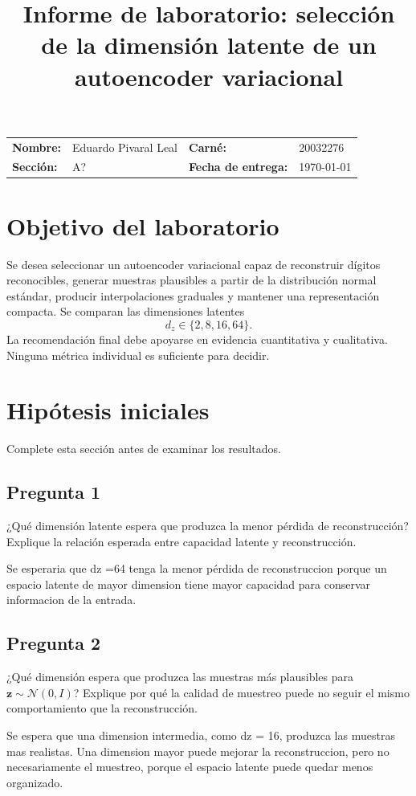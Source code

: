 \documentclass[11pt,letterpaper]{article}
\title{\textbf{Informe de laboratorio: selección de la dimensión latente de un autoencoder variacional}}
\author{}
\date{}
\newcommand{\studentname}{Eduardo Pivaral Leal}
\newcommand{\studentid}{20032276}
\newcommand{\coursesection}{A?}
\newcommand{\submissiondate}{\today}
\begin{document}
\maketitle

\begin{center}
\renewcommand{\arraystretch}{1.35}
\begin{tabularx}{0.92\textwidth}{@{}>{\bfseries}lX>{\bfseries}lX@{}}
Nombre: & \studentname & Carné: & \studentid \\
Sección: & \coursesection & Fecha de entrega: & \submissiondate \\
\end{tabularx}
\end{center}

\section{Objetivo del laboratorio}

Se desea seleccionar un autoencoder variacional capaz de reconstruir dígitos
reconocibles, generar muestras plausibles a partir de la distribución normal
estándar, producir interpolaciones graduales y mantener una representación
compacta. Se comparan las dimensiones latentes
\[
d_z\in\{2,8,16,64\}.
\]
La recomendación final debe apoyarse en evidencia cuantitativa y cualitativa.
Ninguna métrica individual es suficiente para decidir.

\section{Hipótesis iniciales}

Complete esta sección antes de examinar los resultados.

\subsection*{Pregunta 1}
¿Qué dimensión latente espera que produzca la menor pérdida de reconstrucción?
Explique la relación esperada entre capacidad latente y reconstrucción.
\begin{responsebox}
Se esperaria que dz =64 tenga la menor pérdida de reconstruccion porque un espacio latente de mayor dimension tiene mayor capacidad para conservar informacion de la entrada. 
\end{responsebox}


\subsection*{Pregunta 2}
¿Qué dimensión espera que produzca las muestras más plausibles para
$\mathbf z\sim\mathcal N(0,I)$? Explique por qué la calidad de muestreo puede no
seguir el mismo comportamiento que la reconstrucción.
\begin{responsebox}
Se espera que una dimension intermedia, como dz = 16, produzca las muestras mas realistas. Una dimension mayor puede mejorar la reconstruccion, pero no necesariamente el muestreo, porque el espacio latente puede quedar menos organizado.
\end{responsebox}
\end{document}
